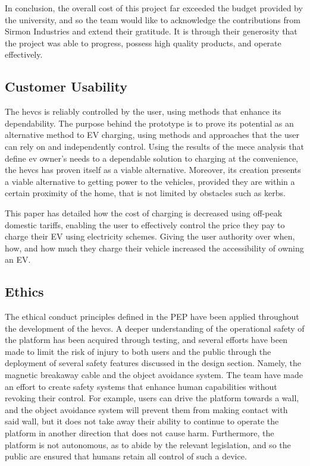 \documentclass [12pt]{article}
\begin{document}
In conclusion, the overall cost of this project far exceeded the budget provided by the university, and so the team would like to acknowledge the contributions from Sirmon Industries and extend their gratitude. It is through their generosity that the project was able to progress, possess high quality products, and operate effectively.  

\subsection{Customer Usability}

The \gls{hevcs} is reliably controlled by the user, using methods that enhance its dependability. The purpose behind the prototype is to prove its potential as an alternative method to EV charging, using methods and approaches that the user can rely on and independently control. Using the results of the \gls{mece} analysis that define \gls{ev} owner’s needs to a dependable solution to charging at the convenience, the \gls{hevcs} has proven itself as a viable alternative. Moreover, its creation presents a viable alternative to getting power to the vehicles, provided they are within a certain proximity of the home, that is not limited by obstacles such as kerbs.   

This paper has detailed how the cost of charging is decreased using off-peak domestic tariffs, enabling the user to effectively control the price they pay to charge their EV using electricity schemes. Giving the user authority over when, how, and how much they charge their vehicle increased the accessibility of owning an EV.  

\subsection{Ethics}

The ethical conduct principles defined in the PEP have been applied throughout the development of the \gls{hevcs}. A deeper understanding of the operational safety of the platform has been acquired through testing, and several efforts have been made to limit the risk of injury to both users and the public through the deployment of several safety features discussed in the design section. Namely, the magnetic breakaway cable and the object avoidance system. The team have made an effort to create safety systems that enhance human capabilities without revoking their control. For example, users can drive the platform towards a wall, and the object avoidance system will prevent them from making contact with said wall, but it does not take away their ability to continue to operate the platform in another direction that does not cause harm. Furthermore, the platform is not autonomous, as to abide by the relevant legislation, and so the public are ensured that humans retain all control of such a device.  
\end{document}
